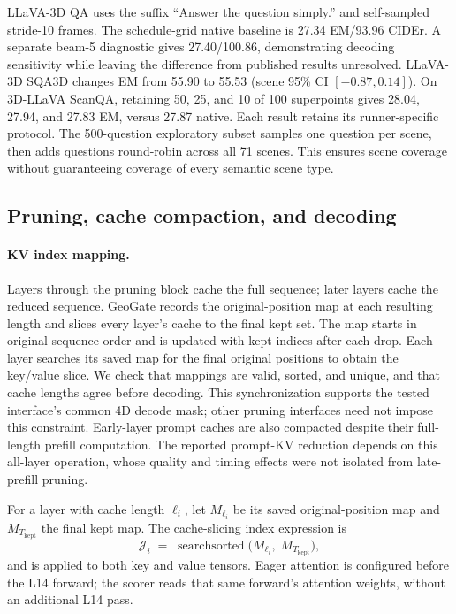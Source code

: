 LLaVA-3D QA uses the suffix ``Answer the question simply.'' and self-sampled stride-10 frames. The schedule-grid native baseline is 27.34 EM/93.96 CIDEr. A separate beam-5 diagnostic gives 27.40/100.86, demonstrating decoding sensitivity while leaving the difference from published results unresolved. LLaVA-3D SQA3D changes EM from 55.90 to 55.53 (scene 95\% CI $[-0.87,0.14]$). On 3D-LLaVA ScanQA, retaining 50, 25, and 10 of 100 superpoints gives 28.04, 27.94, and 27.83 EM, versus 27.87 native. Each result retains its runner-specific protocol. The 500-question exploratory subset samples one question per scene, then adds questions round-robin across all 71 scenes. This ensures scene coverage without guaranteeing coverage of every semantic scene type.

\subsection{Pruning, cache compaction, and decoding}
\label{sec:supp_implementation}
\paragraph{KV index mapping.} Layers through the pruning block cache the full sequence; later layers cache the reduced sequence. GeoGate records the original-position map at each resulting length and slices every layer's cache to the final kept set. The map starts in original sequence order and is updated with kept indices after each drop. Each layer searches its saved map for the final original positions to obtain the key/value slice. We check that mappings are valid, sorted, and unique, and that cache lengths agree before decoding. This synchronization supports the tested interface's common 4D decode mask; other pruning interfaces need not impose this constraint. Early-layer prompt caches are also compacted despite their full-length prefill computation. The reported prompt-KV reduction depends on this all-layer operation, whose quality and timing effects were not isolated from late-prefill pruning.

For a layer with cache length $\ell_i$, let $M_{\ell_i}$ be its saved original-position map and $M_{T_{\text{kept}}}$ the final kept map. The cache-slicing index expression is
\begin{equation}
\mathcal{J}_i \;=\; \operatorname{searchsorted}\!\big(M_{\ell_i},\; M_{T_{\text{kept}}}\big),
\end{equation}
and is applied to both key and value tensors. Eager attention is configured before the L14 forward; the scorer reads that same forward's attention weights, without an additional L14 pass.

